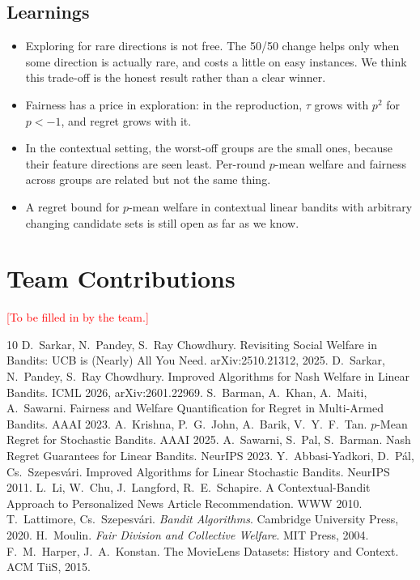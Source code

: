 \documentclass[11pt,a4paper]{article}
\begin{document}
\subsection{Learnings}
\begin{itemize}
  \item Exploring for rare directions is not free. The 50/50 change helps only when some direction is actually rare, and costs a little on easy instances. We think this trade-off is the honest result rather than a clear winner.
  \item Fairness has a price in exploration: in the reproduction, $\tau$ grows with $p^2$ for $p<-1$, and regret grows with it.
  \item In the contextual setting, the worst-off groups are the small ones, because their feature directions are seen least. Per-round $p$-mean welfare and fairness across groups are related but not the same thing.
  \item A regret bound for $p$-mean welfare in contextual linear bandits with arbitrary changing candidate sets is still open as far as we know.
\end{itemize}

\section{Team Contributions}
\textcolor{red}{[To be filled in by the team.]}

\begin{thebibliography}{10}\small
{} D.~Sarkar, N.~Pandey, S.~Ray Chowdhury. Revisiting Social Welfare in Bandits: UCB is (Nearly) All You Need. arXiv:2510.21312, 2025.
 D.~Sarkar, N.~Pandey, S.~Ray Chowdhury. Improved Algorithms for Nash Welfare in Linear Bandits. ICML 2026, arXiv:2601.22969.
 S.~Barman, A.~Khan, A.~Maiti, A.~Sawarni. Fairness and Welfare Quantification for Regret in Multi-Armed Bandits. AAAI 2023.
 A.~Krishna, P.~G.~John, A.~Barik, V.~Y.~F.~Tan. $p$-Mean Regret for Stochastic Bandits. AAAI 2025.
 A.~Sawarni, S.~Pal, S.~Barman. Nash Regret Guarantees for Linear Bandits. NeurIPS 2023.
 Y.~Abbasi-Yadkori, D.~P\'al, Cs.~Szepesv\'ari. Improved Algorithms for Linear Stochastic Bandits. NeurIPS 2011.
 L.~Li, W.~Chu, J.~Langford, R.~E.~Schapire. A Contextual-Bandit Approach to Personalized News Article Recommendation. WWW 2010.
 T.~Lattimore, Cs.~Szepesv\'ari. \emph{Bandit Algorithms}. Cambridge University Press, 2020.
 H.~Moulin. \emph{Fair Division and Collective Welfare}. MIT Press, 2004.
 F.~M.~Harper, J.~A.~Konstan. The MovieLens Datasets: History and Context. ACM TiiS, 2015.
\end{thebibliography}
\end{document}
